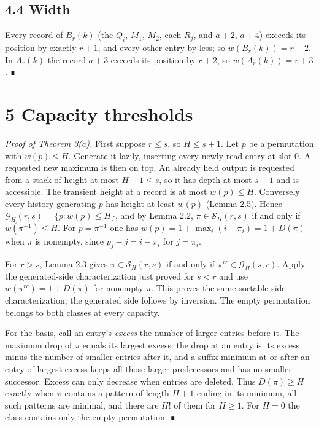 \documentclass[11pt,letterpaper]{article}
\begin{document}
\subsection{4.4 Width}\label{width-1}

Every record of \(B_r(k)\) (the \(Q_i\), \(M_1\), \(M_2\), each \(R_j\),
and \(a+2\), \(a+4\)) exceeds its position by exactly \(r+1\), and every
other entry by less; so \(w(B_r(k))=r+2\). In \(A_r(k)\) the record
\(a+3\) exceeds its position by \(r+2\), so \(w(A_r(k))=r+3\). ∎

\section{5 Capacity thresholds}\label{capacity-thresholds}

\emph{Proof of Theorem 3(a).} First suppose \(r\le s\), so \(H\le s+1\).
Let \(p\) be a permutation with \(w(p)\le H\). Generate it lazily,
inserting every newly read entry at slot \(0\). A requested new maximum
is then on top. An already held output is requested from a stack of
height at most \(H-1\le s\), so it has depth at most \(s-1\) and is
accessible. The transient height at a record is at most \(w(p)\le H\).
Conversely every history generating \(p\) has height at least \(w(p)\)
(Lemma 2.5). Hence \(\mathcal G_H(r,s)=\{p:w(p)\le H\}\), and by Lemma
2.2, \(\pi\in\mathcal S_H(r,s)\) if and only if \(w(\pi^{-1})\le H\).
For \(p=\pi^{-1}\) one has \(w(p)=1+\max_i(i-\pi_i)=1+D(\pi)\) when
\(\pi\) is nonempty, since \(p_j-j=i-\pi_i\) for \(j=\pi_i\).

For \(r>s\), Lemma 2.3 gives \(\pi\in\mathcal S_H(r,s)\) if and only if
\(\pi^{rc}\in\mathcal G_H(s,r)\). Apply the generated-side
characterization just proved for \(s<r\) and use
\(w(\pi^{rc})=1+D(\pi)\) for nonempty \(\pi\). This proves the same
sortable-side characterization; the generated side follows by inversion.
The empty permutation belongs to both classes at every capacity.

For the basis, call an entry's \emph{excess} the number of larger
entries before it. The maximum drop of \(\pi\) equals its largest
excess: the drop at an entry is its excess minus the number of smaller
entries after it, and a suffix minimum at or after an entry of largest
excess keeps all those larger predecessors and has no smaller successor.
Excess can only decrease when entries are deleted. Thus \(D(\pi)\ge H\)
exactly when \(\pi\) contains a pattern of length \(H+1\) ending in its
minimum, all such patterns are minimal, and there are \(H!\) of them for
\(H\ge1\). For \(H=0\) the class contains only the empty permutation. ∎
\end{document}
